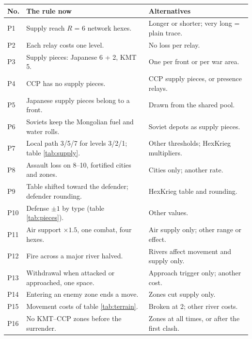 \documentclass[11pt]{article}
\begin{document}
\par\medskip\noindent\begin{minipage}{\textwidth}
\centering\footnotesize
\begin{tabular}{@{}>{\raggedright\arraybackslash}p{}>{\raggedright\arraybackslash}p{}>{\raggedright\arraybackslash}p{}@{}}
\toprule
No. & The rule now & Alternatives \\
\midrule
P1 & Supply reach $R$ = 6 network hexes. & Longer or shorter; very long = plain trace. \\
P2 & Each relay costs one level. & No loss per relay. \\
P3 & Supply pieces: Japanese 6 + 2, KMT 5. & One per front or per war area. \\
P4 & CCP has no supply pieces. & CCP supply pieces, or presence relays. \\
P5 & Japanese supply pieces belong to a front. & Drawn from the shared pool. \\
P6 & Soviets keep the Mongolian fuel and water rolls. & Soviet depots as supply pieces. \\
P7 & Local path 3/5/7 for levels 3/2/1; table \ref{tab:supply}. & Other thresholds; HexKrieg multipliers. \\
P8 & Assault loss on 8--10, fortified cities and zones. & Cities only; another rate. \\
P9 & Table shifted toward the defender; defender rounding. & HexKrieg table and rounding. \\
P10 & Defense $\pm 1$ by type (table \ref{tab:pieces}). & Other values. \\
P11 & Air support $\times 1.5$, one combat, four hexes. & Air supply only; other range or effect. \\
P12 & Fire across a major river halved. & Rivers affect movement and supply only. \\
P13 & Withdrawal when attacked or approached, one space. & Approach trigger only; another cost. \\
P14 & Entering an enemy zone ends a move. & Zones cut supply only. \\
P15 & Movement costs of table \ref{tab:terrain}. & Broken at 2; other river costs. \\
P16 & No KMT--CCP zones before the surrender. & Zones at all times, or after the first clash. \\
\bottomrule
\end{tabular}
\label{tab:choices}\hypertarget{ptest}{}
\end{minipage}
\end{document}
